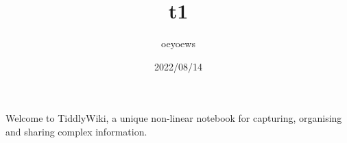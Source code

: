 \documentclass[UTF8,12pt,a4paper]{article}
\title{t1 \emoji{rocket}}
\author{oeyoews}
\date{2022/08/14}
\begin{document}
Welcome to TiddlyWiki, a unique non-linear notebook for capturing, organising and sharing complex information.

\end{document}
